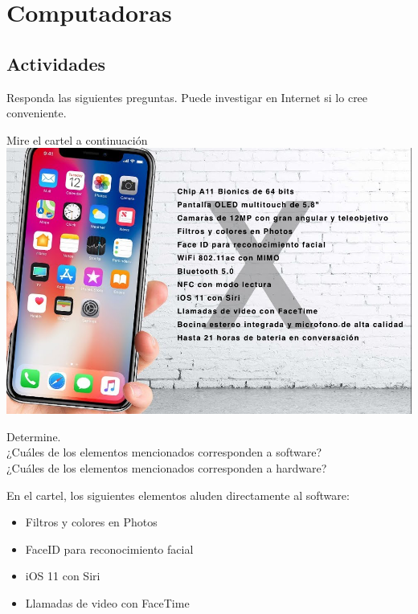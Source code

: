 
\chapter{Computadoras}

\setcounter{section}{2}
\section{Actividades}

Responda las siguientes preguntas. Puede investigar en Internet si lo cree
conveniente.

\begin{exercise}
Mire el cartel a continuación\\
\includegraphics[scale=0.38]{unidades/1_computadoras/1_computadoras/imagenes/iphone_x_specs.png}

Determine.\\
¿Cuáles de los elementos mencionados corresponden a software?\\
¿Cuáles de los elementos mencionados corresponden a hardware?
\end{exercise}

En el cartel, los siguientes elementos aluden directamente al software:

\begin{itemize}
    \item Filtros y colores en Photos
    \item FaceID para reconocimiento facial
    \item iOS 11 con Siri
    \item Llamadas de video con FaceTime
\end{itemize}

